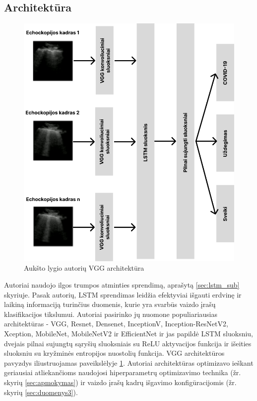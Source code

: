 \documentclass[fleqn]{VUMIFKompMagistrinis}
\begin{document}
\subsection{Architektūra}
\begin{figure}[H]
    \centering
    \includegraphics[scale=0.33]{img/lstm.png}
    \caption{Aukšto lygio autorių VGG architektūra \cite{LSTM}}
    \label{img:lstmvgg}
\end{figure}
Autoriai naudojo ilgos trumpos atminties sprendimą, aprašytą \ref{sec:lstm_sub} skyriuje. Pasak autorių, LSTM sprendimas leidžia efektyviai išgauti erdvinę ir laikiną informaciją turinčius duomenis, kurie yra svarbūs vaizdo įrašų klasifikacijos tikslumui. Autoriai pasirinko jų nuomone populiariausias architektūras - VGG, Resnet, Densenet, InceptionV, Inception-ResNetV2, Xception, MobileNet, MobileNetV2 ir EfficientNet ir jas papildė LSTM sluoksniu, dvejais pilnai sujungtų sąryšių sluoksniais su ReLU aktyvacijos funkcija ir išeities sluoksniu su kryžminės entropijos nuostolių funkcija. VGG architektūros pavyzdys iliustruojamas paveikslėlyje \ref{img:lstmvgg}. Autoriai architektūras optimizavo ieškant geriausiai atliekančioms naudojosi hiperparametrų optimizavimo technika (žr. skyrių \ref{sec:apmokymas}) ir vaizdo įrašų kadrų išgavimo konfigūracijomis (žr. skyrių \ref{sec:duomenys3}). \cite{LSTM} 
\end{document}
